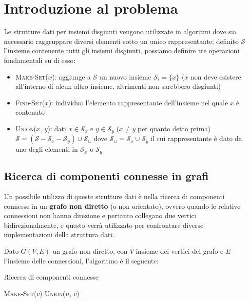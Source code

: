 \section{Introduzione al problema}

Le strutture dati per insiemi disgiunti vengono utilizzate in algoritmi
dove sia necessario raggruppare diversi elementi sotto un unico rappresentante;
definito $\mathcal{S}$ l'insieme contenente tutti gli insiemi disgiunti,
possiamo definire tre operazioni fondamentali su di esso:

\begin{itemize}
    \item \textsc{Make-Set($x$)}: aggiunge a $\mathcal{S}$ un nuovo insieme
          $\mathcal{S}_i = \{x\}$ ($x$ non deve esistere all'interno di alcun altro insieme,
          altrimenti non sarebbero disgiunti)
    \item \textsc{Find-Set($x$)}: individua l'elemento rappresentante dell'insieme nel quale $x$ è contenuto
    \item \textsc{Union($x$, $y$)}: dati $x \in \mathcal{S}_x$ e $y \in \mathcal{S}_y$
          ($x \ne y$ per quanto detto prima) $\mathcal{S} = (\mathcal{S} - \mathcal{S}_x - \mathcal{S}_y) \cup \mathcal{S}_\cup$
          dove $\mathcal{S}_\cup = \mathcal{S}_x \cup \mathcal{S}_y$ il cui rappresentante è
          dato da uno degli elementi in $\mathcal{S}_x$ o $\mathcal{S}_y$
\end{itemize}

\subsection{Ricerca di componenti connesse in grafi}

Un possibile utilizzo di queste strutture dati è nella ricerca di componenti
connesse in un \textbf{grafo non diretto} (o non orientato), ovvero quando le relative
connessioni non hanno direzione e pertanto collegano due vertici bidirezionalmente,
e questo verrà utilizzato per confrontare diverse implementazioni della
struttura dati.\newline

Dato $G(V,E)$ un grafo non diretto, con $V$ insieme dei vertici del grafo e $E$
l'insieme delle connessioni, l'algoritmo è il seguente:

\begin{algorithm}
    \caption{Ricerca di componenti connesse}\label{connectedComponentsAlg}
    \begin{algorithmic}[1]
         \label{alg:firstfor}
        \STATE \textsc{Make-Set($v$)}
        \ENDFOR
         \label{alg:secondfor}
        \STATE \textsc{Union($u$, $v$)}
        \ENDIF
        \ENDFOR
    \end{algorithmic}
\end{algorithm}

